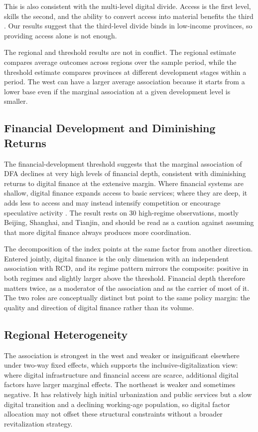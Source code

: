 This is also consistent with the multi-level digital divide. Access is the first level, skills the second, and the ability to convert access into material benefits the third \citep{vandijk2005,norris2001,warschauer2003}. Our results suggest that the third-level divide binds in low-income provinces, so providing access alone is not enough.

The regional and threshold results are not in conflict. The regional estimate compares average outcomes across regions over the sample period, while the threshold estimate compares provinces at different development stages within a period. The west can have a larger average association because it starts from a lower base even if the marginal association at a given development level is smaller.

\subsection{Financial Development and Diminishing Returns}

The financial-development threshold suggests that the marginal association of DFA declines at very high levels of financial depth, consistent with diminishing returns to digital finance at the extensive margin. Where financial systems are shallow, digital finance expands access to basic services; where they are deep, it adds less to access and may instead intensify competition or encourage speculative activity \citep{beck2007}. The result rests on 30 high-regime observations, mostly Beijing, Shanghai, and Tianjin, and should be read as a caution against assuming that more digital finance always produces more coordination.

The decomposition of the index points at the same factor from another direction. Entered jointly, digital finance is the only dimension with an independent association with RCD, and its regime pattern mirrors the composite: positive in both regimes and slightly larger above the threshold. Financial depth therefore matters twice, as a moderator of the association and as the carrier of most of it. The two roles are conceptually distinct but point to the same policy margin: the quality and direction of digital finance rather than its volume.

\subsection{Regional Heterogeneity}

The association is strongest in the west and weaker or insignificant elsewhere under two-way fixed effects, which supports the inclusive-digitalization view: where digital infrastructure and financial access are scarce, additional digital factors have larger marginal effects. The northeast is weaker and sometimes negative. It has relatively high initial urbanization and public services but a slow digital transition and a declining working-age population, so digital factor allocation may not offset these structural constraints without a broader revitalization strategy.

